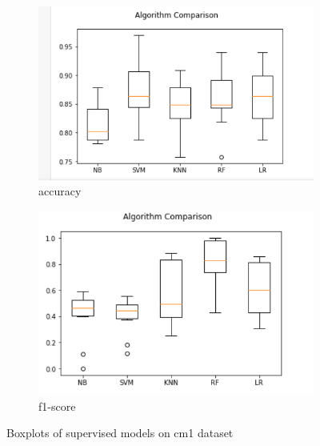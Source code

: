 \begin{figure}[h!]
  \centering
  \begin{subfigure}[b]{0.4\linewidth}
    \includegraphics[width=\linewidth]{report/cm1.png}
    \caption{accuracy}
  \end{subfigure}
  \begin{subfigure}[b]{0.4\linewidth}
    \includegraphics[width=\linewidth]{report/cm1_f.png}
    \caption{f1-score}
  \end{subfigure}
  \caption{Boxplots of supervised models on cm1 dataset}
\end{figure}

\pagebreak

